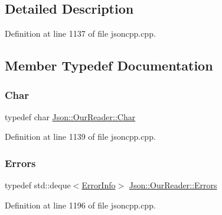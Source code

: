 \subsection{Detailed Description}


Definition at line 1137 of file jsoncpp.\+cpp.



\subsection{Member Typedef Documentation}
\mbox{\label{class_json_1_1_our_reader_a0cd0bab4caa66594ab843ccd5f9dc239}} 
\subsubsection{\texorpdfstring{Char}{Char}}
{\footnotesize\ttfamily typedef char \hyperlink{class_json_1_1_our_reader_a0cd0bab4caa66594ab843ccd5f9dc239}{Json\+::\+Our\+Reader\+::\+Char}}



Definition at line 1139 of file jsoncpp.\+cpp.

\mbox{\label{class_json_1_1_our_reader_a8cc69593ef7303e58e99bb5dbb767562}} 
\subsubsection{\texorpdfstring{Errors}{Errors}}
{\footnotesize\ttfamily typedef std\+::deque$<$\hyperlink{class_json_1_1_our_reader_1_1_error_info}{Error\+Info}$>$ \hyperlink{class_json_1_1_our_reader_a8cc69593ef7303e58e99bb5dbb767562}{Json\+::\+Our\+Reader\+::\+Errors}\hspace{0.3cm}{\ttfamily [private]}}



Definition at line 1196 of file jsoncpp.\+cpp.

\mbox{\label{class_json_1_1_our_reader_a1bdc7bbc52ba87cae6b19746f2ee0189}} 
